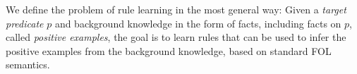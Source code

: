 We define the problem of rule learning in the most general way:
Given a \emph{target predicate} $p$ and background knowledge in the form of facts, including facts on $p$, called \emph{positive examples}, the goal is to learn rules that can be used to infer the positive examples from the background knowledge, based on standard FOL semantics.


% 





